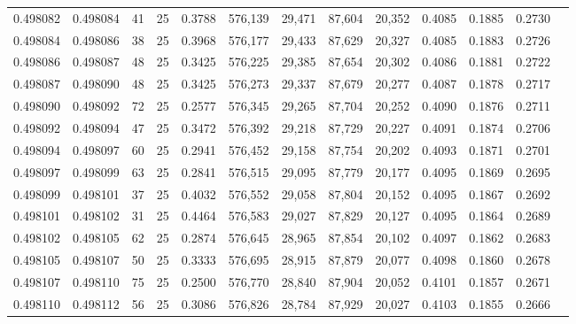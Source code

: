 \begin{tabular}{rrrrrrrrrrrrr}
0.498082 & 0.498084 &    41 &  25 &                                     0.3788 & 576,139 &  29,471 &  87,604 &  20,352 & 0.4085 & 0.1885 & 0.2730 \\
0.498084 & 0.498086 &    38 &  25 &                                     0.3968 & 576,177 &  29,433 &  87,629 &  20,327 & 0.4085 & 0.1883 & 0.2726 \\
0.498086 & 0.498087 &    48 &  25 &                                     0.3425 & 576,225 &  29,385 &  87,654 &  20,302 & 0.4086 & 0.1881 & 0.2722 \\
0.498087 & 0.498090 &    48 &  25 &                                     0.3425 & 576,273 &  29,337 &  87,679 &  20,277 & 0.4087 & 0.1878 & 0.2717 \\
0.498090 & 0.498092 &    72 &  25 &                                     0.2577 & 576,345 &  29,265 &  87,704 &  20,252 & 0.4090 & 0.1876 & 0.2711 \\
0.498092 & 0.498094 &    47 &  25 &                                     0.3472 & 576,392 &  29,218 &  87,729 &  20,227 & 0.4091 & 0.1874 & 0.2706 \\
0.498094 & 0.498097 &    60 &  25 &                                     0.2941 & 576,452 &  29,158 &  87,754 &  20,202 & 0.4093 & 0.1871 & 0.2701 \\
0.498097 & 0.498099 &    63 &  25 &                                     0.2841 & 576,515 &  29,095 &  87,779 &  20,177 & 0.4095 & 0.1869 & 0.2695 \\
0.498099 & 0.498101 &    37 &  25 &                                     0.4032 & 576,552 &  29,058 &  87,804 &  20,152 & 0.4095 & 0.1867 & 0.2692 \\
0.498101 & 0.498102 &    31 &  25 &                                     0.4464 & 576,583 &  29,027 &  87,829 &  20,127 & 0.4095 & 0.1864 & 0.2689 \\
0.498102 & 0.498105 &    62 &  25 &                                     0.2874 & 576,645 &  28,965 &  87,854 &  20,102 & 0.4097 & 0.1862 & 0.2683 \\
0.498105 & 0.498107 &    50 &  25 &                                     0.3333 & 576,695 &  28,915 &  87,879 &  20,077 & 0.4098 & 0.1860 & 0.2678 \\
0.498107 & 0.498110 &    75 &  25 &                                     0.2500 & 576,770 &  28,840 &  87,904 &  20,052 & 0.4101 & 0.1857 & 0.2671 \\
0.498110 & 0.498112 &    56 &  25 &                                     0.3086 & 576,826 &  28,784 &  87,929 &  20,027 & 0.4103 & 0.1855 & 0.2666 \\

\end{tabular}
